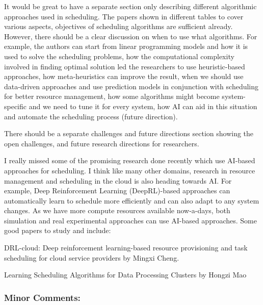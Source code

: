 
It would be great to have a separate section only describing different algorithmic approaches used in scheduling. The papers shown in different tables to cover various aspects, objectives of scheduling algorithms are sufficient already. However, there should be a clear discussion on when to use what algorithms. For example, the authors can start from linear programming models and how it is used to solve the scheduling problems, how the computational complexity involved in finding optimal solution led the researchers to use heuristic-based approaches, how meta-heuristics can improve the result, when we should use data-driven approaches and use prediction models in conjunction with scheduling for better resource management, how some algorithms might become system-specific and we need to tune it for every system, how AI can aid in this situation and automate the scheduling process (future direction).


There should be a separate challenges and future directions section showing the open challenges, and future research directions for researchers.


I really missed some of the promising research done recently which use AI-based approaches for scheduling. I think like many other domains, research in resource management and scheduling in the cloud is also heading towards AI. For example, Deep Reinforcement Learning (DeepRL)-based approaches can automatically learn to schedule more efficiently and can also adapt to any system changes. As we have more compute resources available now-a-days, both simulation and real experimental approaches can use AI-based approaches. Some good papers to study and include:



DRL-cloud: Deep reinforcement learning-based resource provisioning and task scheduling for cloud service providers by Mingxi Cheng.


Learning Scheduling Algorithms for Data Processing Clusters by Hongzi Mao



\subsubsection{Minor Comments:}

